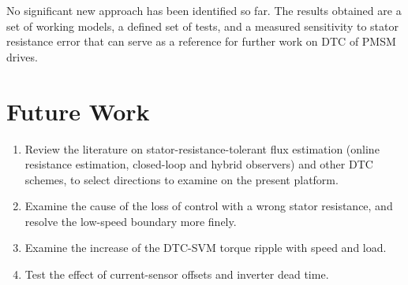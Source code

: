 \documentclass[12pt,a4paper,onecolumn]{IEEEtran}
\begin{document}
No significant new approach has been identified so far. The results obtained are a set of working models, a defined set of tests, and a measured sensitivity to stator resistance error that can serve as a reference for further work on DTC of PMSM drives.

\section{Future Work}
\begin{enumerate}
\item Review the literature on stator-resistance-tolerant flux estimation (online resistance estimation, closed-loop and hybrid observers) and other DTC schemes, to select directions to examine on the present platform.
\item Examine the cause of the loss of control with a wrong stator resistance, and resolve the low-speed boundary more finely.
\item Examine the increase of the DTC-SVM torque ripple with speed and load.
\item Test the effect of current-sensor offsets and inverter dead time.
\end{enumerate}



\end{document}
